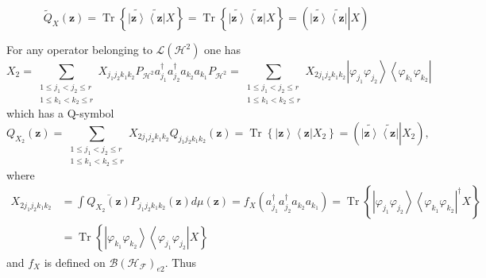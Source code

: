 \documentclass[aps,preprint]{revtex4}%
\begin{document}
\begin{equation}
\tilde{Q}_{X}\left(  \mathbf{z}\right)  =\operatorname*{Tr}\left\{
\widetilde{\left\vert \mathbf{z}\right\rangle }\widetilde{\left\langle
\mathbf{z}\right\vert }X\right\}  =\operatorname*{Tr}\left\{
\widetilde{\left\vert \mathbf{z}\right\rangle }\widetilde{\left\langle
\mathbf{z}\right\vert }X\right\}  =\left(  \left.  \widetilde{\left\vert
\mathbf{z}\right\rangle }\widetilde{\left\langle \mathbf{z}\right\vert
}\right\vert X\right)
\end{equation}


For any operator belonging to $\mathcal{L}\left(  \mathcal{H}^{2}\right)  $
one has
\begin{equation}
X_{2}=\sum_{\substack{1\leq j_{1}<j_{2}\leq r\\1\leq k_{1}<k_{2}\leq
r}}X_{j_{1}j_{2}k_{1}k_{2}}P_{\mathcal{H}^{2}}a_{j_{1}}^{\dagger}a_{j_{2}%
}^{\dagger}a_{k_{2}}a_{k_{1}}P_{\mathcal{H}^{2}}=\sum_{\substack{1\leq
j_{1}<j_{2}\leq r\\1\leq k_{1}<k_{2}\leq r}}X_{2j_{1}j_{2}k_{1}k_{2}%
}\left\vert \varphi_{j_{1}}\varphi_{j_{2}}\right\rangle \left\langle
\varphi_{k_{1}}\varphi_{k_{2}}\right\vert
\end{equation}
which has a Q-symbol
\begin{equation}
Q_{X_{2}}\left(  \mathbf{z}\right)  =\sum_{\substack{1\leq j_{1}<j_{2}\leq
r\\1\leq k_{1}<k_{2}\leq r}}X_{2j_{1}j_{2}k_{1}k_{2}}Q_{j_{1}j_{2}k_{1}k_{2}%
}\left(  \mathbf{z}\right)  =\operatorname*{Tr}\left\{  \left\vert
\mathbf{z}\right\rangle \left\langle \mathbf{z}\right\vert X_{2}\right\}
=\left(  \left.  \widetilde{\left\vert \mathbf{z}\right\rangle }%
\widetilde{\left\langle \mathbf{z}\right\vert }\right\vert X_{2}\right)  ,
\end{equation}
where%
\begin{align}
X_{2j_{1}j_{2}k_{1}k_{2}}  &  =\int\overline{Q_{X_{2}}\left(  \mathbf{z}%
\right)  }P_{j_{1}j_{2}k_{1}k_{2}}\left(  \mathbf{z}\right)  d\mu\left(
\mathbf{z}\right)  =f_{X}\left(  a_{j_{1}}^{\dagger}a_{j_{2}}^{\dagger
}a_{k_{2}}a_{k_{1}}\right)  =\operatorname*{Tr}\left\{  \left\vert
\varphi_{j_{1}}\varphi_{j_{2}}\right\rangle \left\langle \varphi_{k_{1}%
}\varphi_{k_{2}}\right\vert ^{\dagger}X\right\} \nonumber\\
&  =\operatorname*{Tr}\left\{  \left\vert \varphi_{k_{1}}\varphi_{k_{2}%
}\right\rangle \left\langle \varphi_{j_{1}}\varphi_{j_{2}}\right\vert
X\right\}
\end{align}
and $f_{X}$ is defined on $\mathcal{B}\left(  \mathcal{H}_{\mathcal{F}%
}\right)  _{e2}.$ Thus
\end{document}
